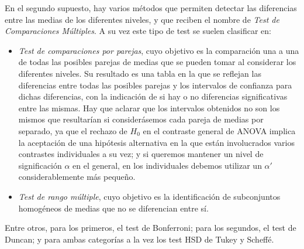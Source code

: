 En el segundo supuesto, hay varios métodos que permiten detectar las diferencias entre las medias de los diferentes
niveles, y que reciben el nombre de \emph{Test de Comparaciones Múltiples}.
A su vez este tipo de test se suelen clasificar en:
\begin{itemize}
\item \emph{Test de comparaciones por parejas}, cuyo objetivo es la comparación una a una de todas las posibles parejas
de medias que se pueden tomar al considerar los diferentes niveles.
Su resultado es una tabla en la que se reflejan las diferencias entre todas las posibles parejas y los intervalos de
confianza para dichas diferencias, con la indicación de si hay o no diferencias significativas entre las mismas.
Hay que aclarar que los intervalos obtenidos no son los mismos que resultarían si considerásemos cada pareja de medias
por separado, ya que el rechazo de $H_0$ en el contraste general de ANOVA implica la aceptación de una hipótesis
alternativa en la que están involucrados varios contrastes individuales a su vez; y si queremos mantener un nivel de
significación $\alpha$ en el general, en los individuales debemos utilizar un $\alpha '$ considerablemente más pequeño.
\item \emph{Test de rango múltiple}, cuyo objetivo es la identificación de subconjuntos homogéneos de medias que no se
diferencian entre sí.
\end{itemize}
Entre otros, para los primeros, el test de Bonferroni; para los segundos, el test de Duncan; y para ambas categorías a
la vez los test HSD de Tukey y Scheffé.

\clearpage
\newpage

